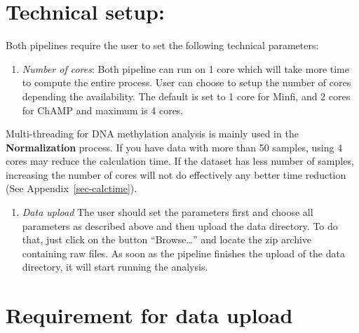 \documentclass[
  a4paper,
  DIV=11,
  numbers=noendperiod,
  oneside,
  open=any]{scrreport}
\providecommand{\tightlist}{%
  \setlength{\itemsep}{0pt}\setlength{\parskip}{0pt}}\usepackage{longtable,booktabs,array}
\begin{document}
\section{Technical setup:}\label{technical-setup}

Both pipelines require the user to set the following technical
parameters:

\begin{enumerate}
\def\labelenumi{\arabic{enumi}.}
\tightlist
\item
  \emph{Number of cores}: Both pipeline can run on 1 core which will
  take more time to compute the entire process. User can choose to setup
  the number of cores depending the availability. The default is set to
  1 core for Minfi, and 2 cores for ChAMP and maximum is 4 cores.
\end{enumerate}

\begin{tcolorbox}[enhanced jigsaw, breakable, colback=white, colbacktitle=quarto-callout-note-color!10!white, opacityback=0, left=2mm, bottomrule=.15mm, opacitybacktitle=0.6, coltitle=black, bottomtitle=1mm, toprule=.15mm, toptitle=1mm, arc=.35mm, titlerule=0mm, rightrule=.15mm, title=\textcolor{quarto-callout-note-color}{\faInfo}\hspace{0.5em}{Note}, colframe=quarto-callout-note-color-frame, leftrule=.75mm]

Multi-threading for DNA methylation analysis is mainly used in the
\textbf{Normalization} process. If you have data with more than 50
samples, using 4 cores may reduce the calculation time. If the dataset
has less number of samples, increasing the number of cores will not do
effectively any better time reduction (See Appendix~\ref{sec-calctime}).

\end{tcolorbox}

\begin{enumerate}
\def\labelenumi{\arabic{enumi}.}
\setcounter{enumi}{1}
\tightlist
\item
  \emph{Data upload} The user should set the parameters first and choose
  all parameters as described above and then upload the data directory.
  To do that, just click on the button ``Browse\ldots{}'' and locate the
  zip archive containing raw files. As soon as the pipeline finishes the
  upload of the data directory, it will start running the analysis.
\end{enumerate}

\section{Requirement for data upload}\label{requirement-for-data-upload}
\end{document}
